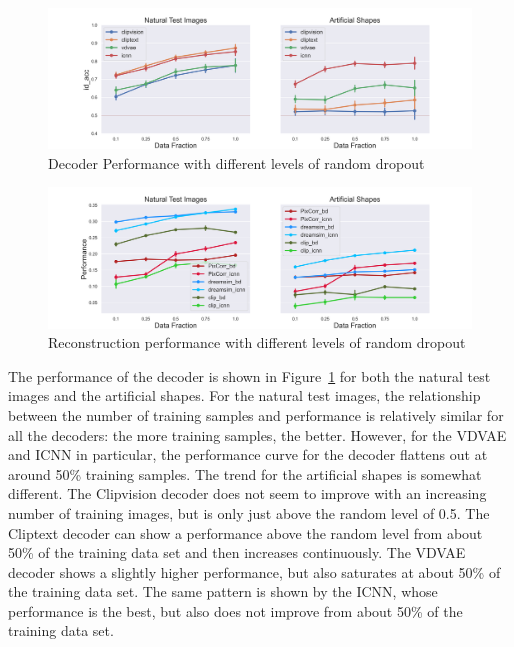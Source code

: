 
\begin{figure}[ht]
    \centering
    \includegraphics[width=1\textwidth]{plots/dropout_random_translator.png}
    \caption{Decoder Performance with different levels of random dropout}\label{fig:dropout_random_translator}
\end{figure}

\begin{figure}[ht]
    \centering
    \includegraphics[width=1\textwidth]{plots/dropout_random_reconstruction.png}
    \caption{Reconstruction performance with different levels of random dropout}\label{fig:dropout_random_reconstruction}
\end{figure}

The performance of the decoder is shown in Figure~\ref{fig:dropout_random_translator} for both the natural test images and the artificial shapes. For the natural test images, the relationship between the number of training samples and performance is relatively similar for all the decoders: the more training samples, the better. However, for the VDVAE and ICNN in particular, the performance curve for the decoder flattens out at around 50\% training samples. The trend for the artificial shapes is somewhat different. The Clipvision decoder does not seem to improve with an increasing number of training images, but is only just above the random level of 0.5. The Cliptext decoder can show a performance above the random level from about 50\% of the training data set and then increases continuously. The VDVAE decoder shows a slightly higher performance, but also saturates at about 50\% of the training data set. The same pattern is shown by the ICNN, whose performance is the best, but also does not improve from about 50\% of the training data set. 


